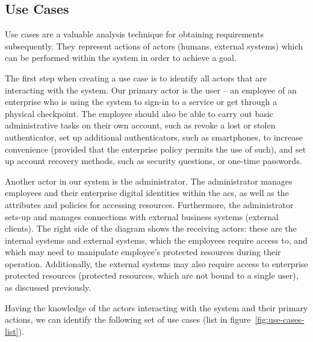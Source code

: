 \subsection{Use Cases} \label{sec:analysis-usecases}
Use cases are a valuable analysis technique for obtaining requirements subsequently. They represent actions of actors (humans, external systems) which can be performed within the system in order to achieve a goal. 


The first step when creating a use case is to identify all actors that are interacting with the system. Our primary actor is the user -- an employee of an enterprise who is using the system to sign-in to a service or get through a physical checkpoint. The employee should also be able to carry out basic administrative tasks on their own account, such as revoke a lost or stolen authenticator, set up additional authenticators, such as smartphones, to increase convenience (provided that the enterprise policy permits the use of such),  and set up account recovery methods, such as security questions, or one-time passwords.

Another actor in our system is the administrator. The administrator manages employees and their enterprise digital identities within the \acrshort{acs}, as well as the attributes and policies for accessing resources. Furthermore, the administrator sets-up and manages connections with external business systems (external clients). The right side of the diagram shows the receiving actors: these are the internal systems and external systems, which the employees require access to, and which may need to manipulate employee's protected resources during their operation. Additionally, the external systems may also require access to enterprise protected resources (protected resources, which are not bound to a single user), as discussed previously\footnotemark.
% 

Having the knowledge of the actors interacting with the system and their primary actions, we can identify the following set of use cases (list in figure~\ref{fig:use-cases-list}). 

